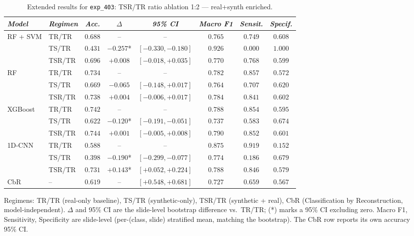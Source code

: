 \begin{table}[htp]
\centering
\scriptsize
\caption{Extended results for \texttt{exp\_403}: TSR/TR ratio ablation 1:2 — real+synth enriched.}
\label{tab:appendix_exp_403}
\begin{tabular*}{\textwidth}{@{\extracolsep{\fill}}llcccccc}
\toprule
\emph{Model} & \emph{Regimen} & \emph{Acc.} & \emph{$\Delta$} & \emph{95\% CI} & \emph{Macro F1} & \emph{Sensit.} & \emph{Specif.}\\
\midrule
\multirow{3}{*}{RF + SVM} & TR/TR & $0.688$ & -- & -- & $0.765$ & $0.749$ & $0.608$\\
 & TS/TR & $0.431$ & $-0.257$* & $[-0.330, -0.180]$ & $0.926$ & $0.000$ & $1.000$\\
 & TSR/TR & $0.696$ & $+0.008$ & $[-0.018, +0.035]$ & $0.770$ & $0.768$ & $0.599$\\
\midrule
\multirow{3}{*}{RF} & TR/TR & $0.734$ & -- & -- & $0.782$ & $0.857$ & $0.572$\\
 & TS/TR & $0.669$ & $-0.065$ & $[-0.148, +0.017]$ & $0.764$ & $0.707$ & $0.620$\\
 & TSR/TR & $0.738$ & $+0.004$ & $[-0.006, +0.017]$ & $0.784$ & $0.841$ & $0.602$\\
\midrule
\multirow{3}{*}{XGBoost} & TR/TR & $0.742$ & -- & -- & $0.788$ & $0.854$ & $0.595$\\
 & TS/TR & $0.622$ & $-0.120$* & $[-0.191, -0.051]$ & $0.737$ & $0.583$ & $0.674$\\
 & TSR/TR & $0.744$ & $+0.001$ & $[-0.005, +0.008]$ & $0.790$ & $0.852$ & $0.601$\\
\midrule
\multirow{3}{*}{1D-CNN} & TR/TR & $0.588$ & -- & -- & $0.875$ & $0.919$ & $0.152$\\
 & TS/TR & $0.398$ & $-0.190$* & $[-0.299, -0.077]$ & $0.774$ & $0.186$ & $0.679$\\
 & TSR/TR & $0.731$ & $+0.143$* & $[+0.052, +0.224]$ & $0.788$ & $0.846$ & $0.579$\\
\midrule
CbR & -- & $0.619$ & -- & $[+0.548, +0.681]$ & $0.727$ & $0.659$ & $0.567$\\
\bottomrule
\end{tabular*}
\small{Regimens: TR/TR (real-only baseline), TS/TR (synthetic-only), TSR/TR (synthetic + real), CbR (Classification by Reconstruction, model-independent). $\Delta$ and 95\% CI are the slide-level bootstrap difference vs.\ TR/TR; (*) marks a 95\% CI excluding zero. Macro F1, Sensitivity, Specificity are slide-level (per-(class, slide) stratified mean, matching the bootstrap). The CbR row reports its own accuracy 95\% CI.}
\end{table}

